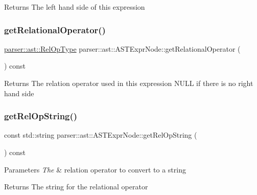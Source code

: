 \begin{DoxyReturn}{Returns}
The left hand side of this expression 
\end{DoxyReturn}
\mbox{\label{classparser_1_1ast_1_1ASTExprNode_af4efd2fc330c3fa5da59334b9db9b104}} 
\subsubsection{\texorpdfstring{get\+Relational\+Operator()}{getRelationalOperator()}}
{\footnotesize\ttfamily \hyperlink{ASTExprNode_8h_ade5793e91a548ec55c1a8e776984297a}{parser\+::ast\+::\+Rel\+Op\+Type} parser\+::ast\+::\+A\+S\+T\+Expr\+Node\+::get\+Relational\+Operator (\begin{DoxyParamCaption}{ }\end{DoxyParamCaption}) const}

\begin{DoxyReturn}{Returns}
The relation operator used in this expression N\+U\+LL if there is no right hand side 
\end{DoxyReturn}
\mbox{\label{classparser_1_1ast_1_1ASTExprNode_a3e781b545bb07447252f265a06f94b93}} 
\subsubsection{\texorpdfstring{get\+Rel\+Op\+String()}{getRelOpString()}}
{\footnotesize\ttfamily const std\+::string parser\+::ast\+::\+A\+S\+T\+Expr\+Node\+::get\+Rel\+Op\+String (\begin{DoxyParamCaption}{ }\end{DoxyParamCaption}) const}


\begin{DoxyParams}{Parameters}
{\em The} & relation operator to convert to a string \\
\hline
\end{DoxyParams}
\begin{DoxyReturn}{Returns}
The string for the relational operator 
\end{DoxyReturn}
\mbox{\label{classparser_1_1ast_1_1ASTExprNode_a23aad8e7397e524848446e9bdcdc4141}} 

